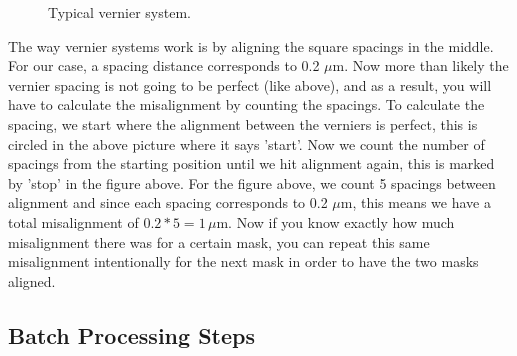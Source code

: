 \documentclass{article}
\begin{document}
\begin{figure}[H]
\centering
{}
\caption{Typical vernier system.}
\end{figure}
The way vernier systems work is by aligning the square spacings in the middle. For our case, a spacing distance corresponds to 0.2 $\mu$m. Now more than likely the vernier spacing is not going to be perfect (like above), and as a result, you will have to calculate the misalignment by counting the spacings. To calculate the spacing, we start where the alignment between the verniers is perfect, this is circled in the above picture where it says 'start'. Now we count the number of spacings from the starting position until we hit alignment again, this is marked by 'stop' in the figure above. For the figure above, we count 5 spacings between alignment and since each spacing corresponds to 0.2 $\mu$m, this means we have a total misalignment of $0.2*5 = 1\,\mu$m. Now if you know exactly how much misalignment there was for a certain mask, you can repeat this same misalignment intentionally for the next mask in order to have the two masks aligned.

\subsection{Batch Processing Steps}
\end{document}
